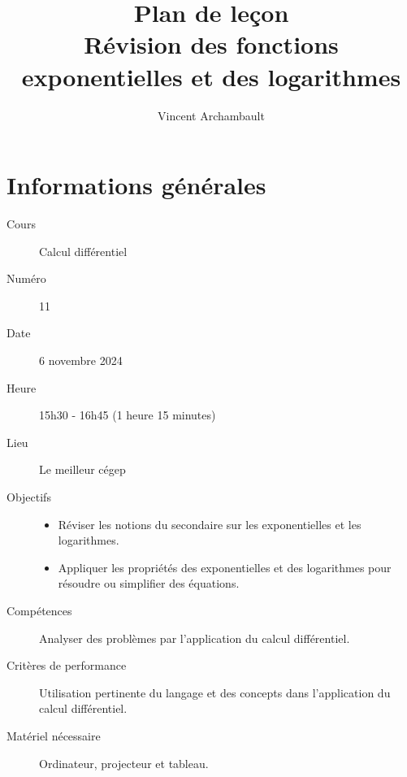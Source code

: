 \documentclass[12pt]{article}
\title{Plan de leçon\\ Révision des fonctions exponentielles et des logarithmes}
\author{Vincent Archambault}
\date{}
\begin{document}
\maketitle

\section*{Informations générales}
\begin{description}
\item[\faBook{} Cours] Calcul différentiel
\item[{\faHashtag} Numéro] 11
\item[{\faCalendar*[regular]} Date] 6 novembre 2024
\item[{\faClock[regular]} Heure] 15h30 - 16h45 (1 heure 15 minutes)
\item[\faLandmark{} Lieu] Le meilleur cégep
\item[\faBullseye{} Objectifs]
\mbox{}\newline\leavevmode\vspace{-3ex}\begin{itemize}
    \item Réviser les notions du secondaire sur les exponentielles et les logarithmes.
    \item Appliquer les propriétés des exponentielles et des logarithmes pour résoudre ou simplifier des équations.
\end{itemize}
\item[\faToolbox{} Compétences] Analyser des problèmes par l’application du calcul différentiel.
\item[\faUserCheck{} Critères de performance] Utilisation pertinente du langage et des concepts dans l’application du calcul différentiel.
\item[\faTv{} Matériel nécessaire] Ordinateur, projecteur et tableau.
\end{description}

\clearpage
\end{document}
